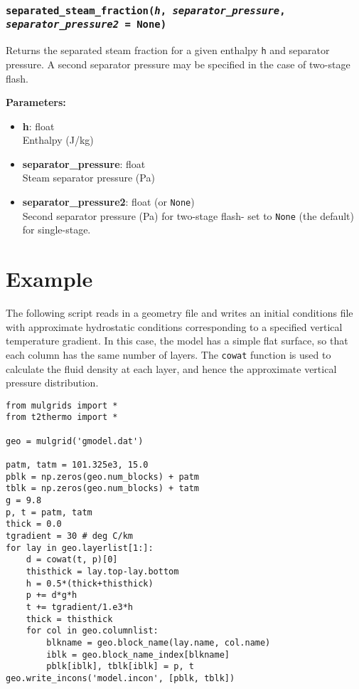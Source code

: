 \begin{snugshade}
\subsubsection{\texttt{separated\_steam\_fraction(\emph{h}, \emph{separator\_pressure}, \emph{separator\_pressure2} = None)}}
\end{snugshade}
\label{sec:t2thermo:separated_steam_fraction}

Returns the separated steam fraction for a given enthalpy \texttt{h} and separator pressure.  A second separator pressure may be specified in the case of two-stage flash.

\textbf{Parameters:}
\begin{itemize}
\item \textbf{h}: float\\
  Enthalpy (J/kg)
\item \textbf{separator\_pressure}: float\\
  Steam separator pressure (Pa)
\item \textbf{separator\_pressure2}: float (or \texttt{None})\\
  Second separator pressure (Pa) for two-stage flash- set to \texttt{None} (the default) for single-stage.
\end{itemize}

\section{Example}

The following script reads in a geometry file and writes an initial conditions file with approximate hydrostatic conditions corresponding to a specified vertical temperature gradient.  In this case, the model has a simple flat surface, so that each column has the same number of layers.  The \texttt{cowat} function is used to calculate the fluid density at each layer, and hence the approximate vertical pressure distribution.

\begin{lstlisting}
from mulgrids import *
from t2thermo import *

geo = mulgrid('gmodel.dat')

patm, tatm = 101.325e3, 15.0
pblk = np.zeros(geo.num_blocks) + patm
tblk = np.zeros(geo.num_blocks) + tatm
g = 9.8
p, t = patm, tatm
thick = 0.0
tgradient = 30 # deg C/km
for lay in geo.layerlist[1:]:
    d = cowat(t, p)[0]
    thisthick = lay.top-lay.bottom
    h = 0.5*(thick+thisthick)
    p += d*g*h
    t += tgradient/1.e3*h
    thick = thisthick
    for col in geo.columnlist:
        blkname = geo.block_name(lay.name, col.name)
        iblk = geo.block_name_index[blkname]
        pblk[iblk], tblk[iblk] = p, t
geo.write_incons('model.incon', [pblk, tblk])
\end{lstlisting}
